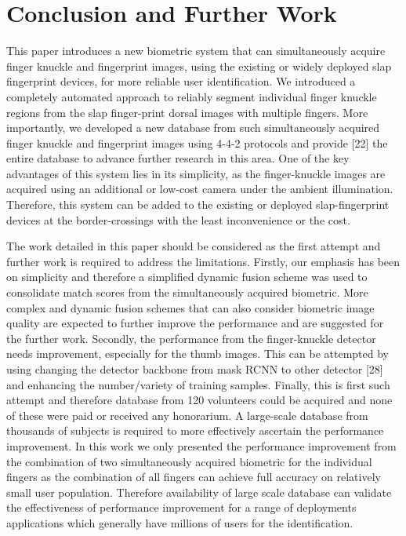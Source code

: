 \section{Conclusion and Further Work\label{conclusion}}

This paper introduces a new biometric system that can simultaneously acquire finger knuckle and fingerprint images, using the existing or widely deployed slap fingerprint devices, for more reliable user identification. We introduced a completely automated approach to reliably segment individual finger knuckle regions from the slap finger-print dorsal images with multiple fingers. More importantly, we developed a new database from such simultaneously acquired finger knuckle and fingerprint images using 4-4-2 protocols and provide [22] the entire database to advance further research in this area. One of the key advantages of this system lies in its simplicity, as the finger-knuckle images are acquired using an additional or low-cost camera under the ambient illumination. Therefore, this system can be added to the existing or deployed slap-fingerprint devices at the border-crossings with the least inconvenience or the cost.    

The work detailed in this paper should be considered as the first attempt and further work is required to address the limitations. Firstly, our emphasis has been on simplicity and therefore a simplified dynamic fusion scheme was used to consolidate match scores from the simultaneously acquired biometric. More complex and dynamic fusion schemes that can also consider biometric image quality are expected to further improve the performance and are suggested for the further work. Secondly, the performance from the finger-knuckle detector needs improvement, especially for the thumb images. This can be attempted by using changing the detector backbone from mask RCNN to other detector [28] and enhancing the number/variety of training samples. Finally, this is first such attempt and therefore database from 120 volunteers could be acquired and none of these were paid or received any honorarium. A large-scale database from thousands of subjects is required to more effectively ascertain the performance improvement. In this work we only presented the performance improvement from the combination of two simultaneously acquired biometric for the individual fingers as the combination of all fingers can achieve full accuracy on relatively small user population. Therefore availability of large scale database can validate the effectiveness of performance improvement for a range of deployments applications which generally have millions of users for the identification.